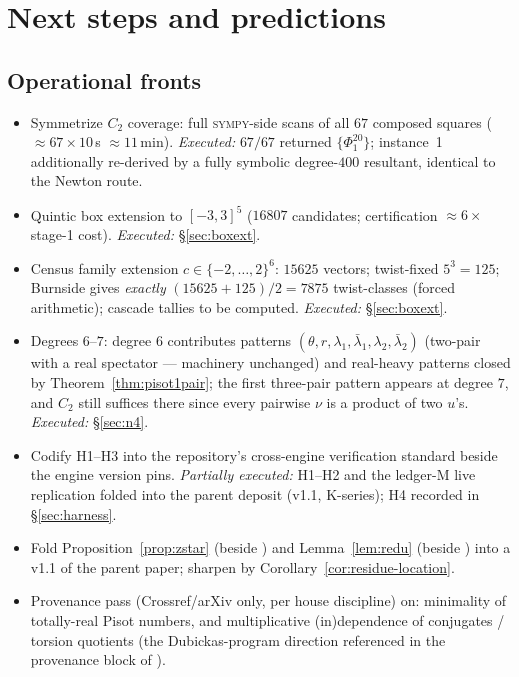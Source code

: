 \documentclass[11pt]{article}
\newcommand{\sy}{\textsc{sympy}}
\theoremstyle{definition}
\begin{document}
\section{Next steps and predictions}\label{sec:next}

\subsection{Operational fronts}
\begin{itemize}
\item[\textbf{N1.}] Symmetrize $C_2$ coverage: full \sy-side scans of all $67$
composed squares ($\approx67\times10$\,s $\approx11$\,min). \emph{Executed:}
$67/67$ returned $\{\Phi_1^{20}\}$; instance~1 additionally re-derived by a
fully symbolic degree-$400$ resultant, identical to the Newton route.
\item[\textbf{N2.}] Quintic box extension to $[-3,3]^5$ ($16807$ candidates;
certification $\approx6\times$ stage-1 cost). \emph{Executed:}
\S\ref{sec:boxext}.
\item[\textbf{N3.}] Census family extension $c\in\{-2,\dots,2\}^6$: $15625$
vectors; twist-fixed $5^3=125$; Burnside gives \emph{exactly}
$(15625+125)/2=7875$ twist-classes (forced arithmetic); cascade tallies to be
computed. \emph{Executed:} \S\ref{sec:boxext}.
\item[\textbf{N4.}] Degrees $6$--$7$: degree $6$ contributes patterns
$(\theta,r,\lambda_1,\bar\lambda_1,\lambda_2,\bar\lambda_2)$ (two-pair with a
real spectator --- machinery unchanged) and real-heavy patterns closed by
Theorem~\ref{thm:pisot1pair}; the first three-pair pattern appears at degree
$7$, and $C_2$ still suffices there since every pairwise $\nu$ is a product of
two $u$'s. \emph{Executed:} \S\ref{sec:n4}.
\item[\textbf{N5.}] Codify H1--H3 into the repository's cross-engine
verification standard beside the engine version pins. \emph{Partially
executed:} H1--H2 and the ledger-M live replication folded into the parent
deposit (v1.1, K-series); H4 recorded in \S\ref{sec:harness}.
\item[\textbf{N6.}] Fold Proposition~\ref{prop:zstar} (beside
\cite[Ex.~7.19]{relcharge}) and Lemma~\ref{lem:redu} (beside
\cite[Rem.~7.6]{relcharge}) into a v1.1 of the parent paper; sharpen
\cite[Cor.~7.16]{relcharge} by Corollary~\ref{cor:residue-location}.
\item[\textbf{N7.}] Provenance pass (Crossref/arXiv only, per house discipline)
on: minimality of totally-real Pisot numbers, and multiplicative
(in)dependence of conjugates / torsion quotients (the Dubickas-program
direction referenced in the provenance block of \cite{relcharge}).
\end{itemize}
\end{document}
